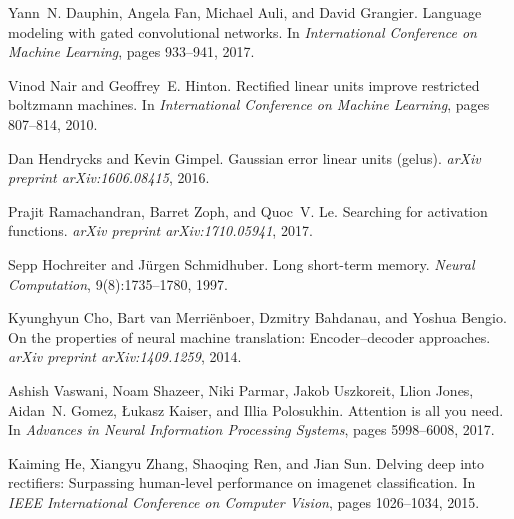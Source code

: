 \documentclass[11pt]{article}
\begin{document}

\begin{thebibliography}{10}

Yann~N. Dauphin, Angela Fan, Michael Auli, and David Grangier.
\newblock Language modeling with gated convolutional networks.
\newblock In \emph{International Conference on Machine Learning}, pages 933--941, 2017.

Vinod Nair and Geoffrey~E. Hinton.
\newblock Rectified linear units improve restricted boltzmann machines.
\newblock In \emph{International Conference on Machine Learning}, pages 807--814, 2010.

Dan Hendrycks and Kevin Gimpel.
\newblock Gaussian error linear units (gelus).
\newblock \emph{arXiv preprint arXiv:1606.08415}, 2016.

Prajit Ramachandran, Barret Zoph, and Quoc~V. Le.
\newblock Searching for activation functions.
\newblock \emph{arXiv preprint arXiv:1710.05941}, 2017.

Sepp Hochreiter and J{\"u}rgen Schmidhuber.
\newblock Long short-term memory.
\newblock \emph{Neural Computation}, 9(8):1735--1780, 1997.

Kyunghyun Cho, Bart van Merri{\"e}nboer, Dzmitry Bahdanau, and Yoshua Bengio.
\newblock On the properties of neural machine translation: Encoder--decoder approaches.
\newblock \emph{arXiv preprint arXiv:1409.1259}, 2014.

Ashish Vaswani, Noam Shazeer, Niki Parmar, Jakob Uszkoreit, Llion Jones, Aidan~N. Gomez, {\L}ukasz Kaiser, and Illia Polosukhin.
\newblock Attention is all you need.
\newblock In \emph{Advances in Neural Information Processing Systems}, pages 5998--6008, 2017.

Kaiming He, Xiangyu Zhang, Shaoqing Ren, and Jian Sun.
\newblock Delving deep into rectifiers: Surpassing human-level performance on imagenet classification.
\newblock In \emph{IEEE International Conference on Computer Vision}, pages 1026--1034, 2015.

\end{thebibliography}
\end{document}
